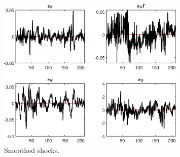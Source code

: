  
\begin{figure}[H]
\centering 
\includegraphics[width=0.80\textwidth]{BRS_est_shopping/graphs/BRS_est_shopping_SmoothedShocks1}
\caption{Smoothed shocks.}\label{Fig:SmoothedShocks:1}
\end{figure}


